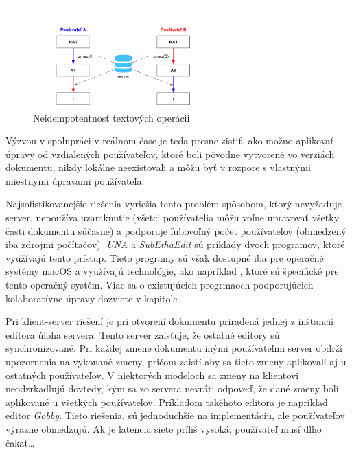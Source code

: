 \begin{figure}[h]
\centerline{\includegraphics[width=0.6\textwidth]{images/neidempotentne_operacie}}
\caption[Neidempotentnosť textových operácii]{Neidempotentnosť textových operácii}
\label{obr:neidempotentnost}
\end{figure}

Výzvou v spolupráci v reálnom čase je teda presne zistiť, ako možno aplikovať úpravy
od vzdialených používateľov, ktoré boli pôvodne vytvorené vo verziách dokumentu,
nikdy lokálne neexistovali a môžu byť v rozpore s vlastnými miestnymi úpravami používateľa. 

Najsofistikovanejšie riešenia vyriešia tento problém spôsobom, ktorý nevyžaduje server,
nepoužíva uzamknutie (všetci používatelia môžu voľne upravovať všetky časti dokumentu súčasne) 
a podporuje ľubovoľný počet používateľov (obmedzený iba zdrojmi počítačov). 
\textit{UNA} a \textit{SubEthaEdit} sú príklady dvoch programov, ktoré využívajú tento prístup.
Tieto programy sú však dostupné iba pre operačné systémy macOS a využívajú technológie,
ako napríklad \cite{bonjour}, ktoré sú špecifické pre tento operačný systém. Viac sa o
existujúcich progrmaoch podporujúcich kolaboratívne úpravy dozviete v kapitole %

Pri klient-server riešení je pri otvorení dokumentu priradená jednej z inštancií editora
úloha servera. Tento server zaisťuje, že ostatné editory sú synchronizované. Pri každej zmene
dokumentu inými používateľmi server obdrží upozornenia na vykonané zmeny, pričom zaistí aby
sa tieto zmeny aplikovali aj u ostatných používateľov. 
V niektorých modeloch sa zmeny na klientovi neodzrkadľujú dovtedy,
kým sa zo servera nevráti odpoveď, že dané zmeny boli aplikované u všetkých používateľov.
Príkladom takéhoto editora je napríklad editor \textit{Gobby}. Tieto riešenia, sú 
jednoduchšie na implementáciu, ale používateľov výrazne obmedzujú. Ak je latencia siete
príliš vysoká, používateľ musí dlho čakať\dots

